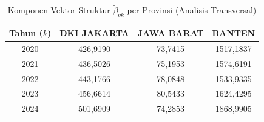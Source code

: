 \begin{table}[H]
\centering
\small
\caption{Komponen Vektor Struktur $\tilde{\beta}_{gk}$ per Provinsi (Analisis Transversal)} \label{tab:app2beta_provinsi}
\begin{tabular}{|c|c|c|c|}
\hline
\textbf{Tahun ($k$)} & \textbf{DKI JAKARTA} & \textbf{JAWA BARAT} & \textbf{BANTEN} \\
\hline
2020 & 426,9190 & 73,7415 & 1517,1837 \\
2021 & 436,5026 & 75,1953 & 1574,6191 \\
2022 & 443,1766 & 78,0848 & 1533,9335 \\
2023 & 456,6614 & 80,5433 & 1624,4295 \\
2024 & 501,6909 & 74,2853 & 1868,9905 \\
\hline
\end{tabular}
\end{table}
